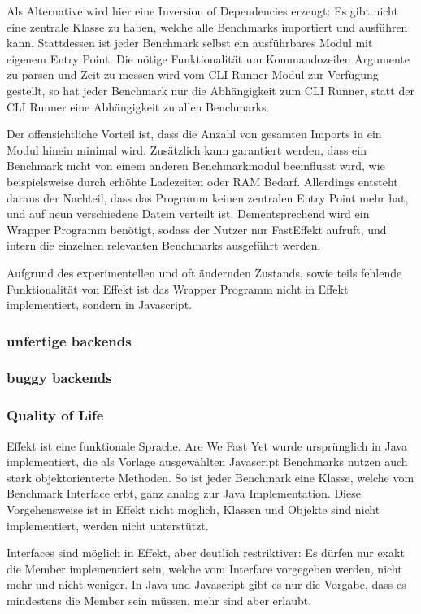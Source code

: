 Als Alternative wird hier eine Inversion of Dependencies erzeugt: Es gibt nicht eine zentrale Klasse zu haben, welche alle Benchmarks importiert und ausführen kann.
Stattdessen ist jeder Benchmark selbst ein ausführbares Modul mit eigenem Entry Point. Die nötige Funktionalität um Kommandozeilen Argumente zu parsen und Zeit zu messen wird vom
CLI Runner Modul zur Verfügung gestellt, so hat jeder Benchmark nur die Abhängigkeit zum CLI Runner, statt der CLI Runner eine Abhängigkeit zu allen Benchmarks.

Der offensichtliche Vorteil ist, dass die Anzahl von gesamten Imports in ein Modul hinein minimal wird. Zusätzlich kann garantiert werden, dass ein Benchmark nicht von einem anderen Benchmarkmodul beeinflusst wird, 
wie beispielsweise durch erhöhte Ladezeiten oder RAM Bedarf. 
Allerdings entsteht daraus der Nachteil, dass das Programm keinen zentralen Entry Point mehr hat, und auf neun verschiedene Datein verteilt ist. Dementsprechend wird ein 
Wrapper Programm benötigt, sodass der Nutzer nur FastEffekt aufruft, und intern die einzelnen relevanten Benchmarks ausgeführt werden.

Aufgrund des experimentellen und oft ändernden Zustands, sowie teils fehlende Funktionalität von Effekt ist das Wrapper Programm nicht in Effekt implementiert, sondern in Javascript.

\subsubsection{unfertige backends}

\subsubsection{buggy backends}



\subsubsection{ Quality of Life }
Effekt ist eine funktionale Sprache. Are We Fast Yet wurde ursprünglich in Java implementiert, die als Vorlage ausgewählten Javascript Benchmarks nutzen auch stark objektorienterte Methoden.
So ist jeder Benchmark eine Klasse, welche vom Benchmark Interface erbt, ganz analog zur Java Implementation.
Diese Vorgehensweise ist in Effekt nicht möglich, Klassen und Objekte sind nicht implementiert, werden nicht unterstützt.

Interfaces sind möglich in Effekt, aber deutlich restriktiver: Es dürfen nur exakt die Member implementiert sein, welche vom Interface vorgegeben werden, nicht mehr und nicht weniger.
In Java und Javascript gibt es nur die Vorgabe, dass es mindestens die Member sein müssen, mehr sind aber erlaubt.

